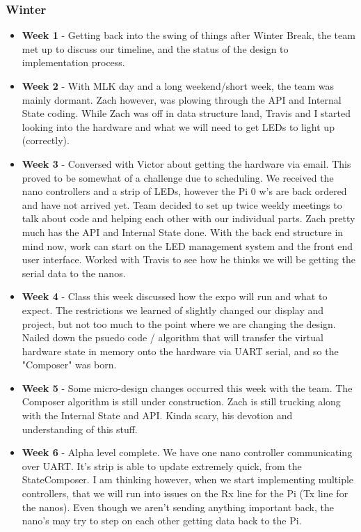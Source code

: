 \documentclass[onecolumn, draftclsnofoot,10pt, compsoc]{IEEEtran}
\begin{document}
			\subsubsection{Winter}
				\begin{itemize}
					\item \textbf{Week 1} - Getting back into the swing of things after Winter Break, the team met up to discuss our timeline, and the status of the design to implementation process. 
					\item \textbf{Week 2} - With MLK day and a long weekend/short week, the team was mainly dormant. Zach however, was plowing through the API and Internal State coding.  While Zach was off in data structure land, Travis and I started looking into the hardware and what we will need to get LEDs to light up (correctly).
					\item \textbf{Week 3} - Conversed with Victor about getting the hardware via email. This proved to be somewhat of a challenge due to scheduling. We received the nano controllers and a strip of LEDs, however the Pi 0 w's are back ordered and have not arrived yet. Team decided to set up twice weekly meetings to talk about code and helping each other with our individual parts. Zach pretty much has the API and Internal State done.  With the back end structure in mind now, work can start on the LED management system and the front end user interface. Worked with Travis to see how he thinks we will be getting the serial data to the nanos.
					\item \textbf{Week 4} - Class this week discussed how the expo will run and what to expect. The restrictions we learned of slightly changed our display and project, but not too much to the point where we are changing the design. Nailed down the psuedo code / algorithm that will transfer the virtual hardware state in memory onto the hardware via UART serial, and so the "Composer" was born.
					\item \textbf{Week 5} - Some micro-design changes occurred this week with the team. The Composer algorithm is still under construction. Zach is still trucking along with the Internal State and API. Kinda scary, his devotion and understanding of this stuff.
					\item \textbf{Week 6} - Alpha level complete. We have one nano controller communicating over UART. It's strip is able to update extremely quick, from the StateComposer. I am thinking however, when we start implementing multiple controllers, that we will run into issues on the Rx line for the Pi (Tx line for the nanos). Even though we aren't sending anything important back, the nano's may try to step on each other getting data back to the Pi.

\end{itemize}
\end{document}
